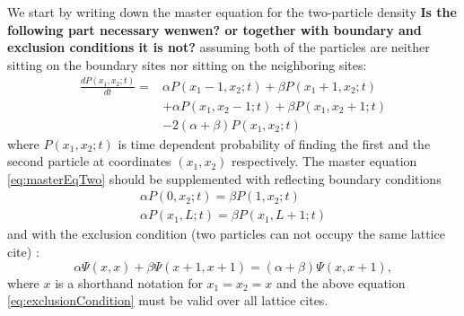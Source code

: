 \documentclass[aps,showpacs,twocolumn,floatfix,prx,superscriptaddress]{revtex4-1}
\begin{document}
We start by writing down the master equation for the two-particle density {\bf Is the following part necessary wenwen? or together with boundary and exclusion conditions it is not? } assuming both of the particles are neither sitting on the boundary sites nor sitting on the neighboring sites:
\begin{equation}
    \begin{aligned}
    \label{eq:masterEqTwo}
    \frac{d P(x_1, x_2; t)}{dt} = & \alpha P(x_1-1,x_2;t) + \beta P(x_1+1,x_2;t) \\ 
    & + \alpha P(x_1, x_2-1; t) + \beta P(x_1, x_2+1; t)  \\ 
    & - 2(\alpha+\beta)P(x_1, x_2; t)
    \end{aligned}
\end{equation}
where $P(x_1, x_2; t)$ is time dependent probability of finding the first and the second particle  at coordinates $(x_1, x_2)$ respectively. The master equation \ref{eq:masterEqTwo} should be supplemented with reflecting boundary conditions \cite{} 
\begin{subequations}
    \label{eq:boundaries-two-particles}
    \begin{eqnarray}
        \alpha P(0,x_2;t) = \beta P(1, x_2;t) \\
        \alpha P(x_1, L;t) = \beta P(x_1, L+1;t)
    \end{eqnarray}
\end{subequations}
and with the exclusion condition (two particles can not occupy the same lattice cite) \cite{}: %
\begin{equation}
    \label{eq:exclusionCondition}
    \alpha \Psi(x, x) + \beta \Psi(x+1, x+1) = (\alpha + \beta) \Psi(x, x+1),
\end{equation}
where $x$ is a shorthand notation for $x_1=x_2=x$ and the above equation \eqref{eq:exclusionCondition} must be valid over all lattice cites.
\end{document}
